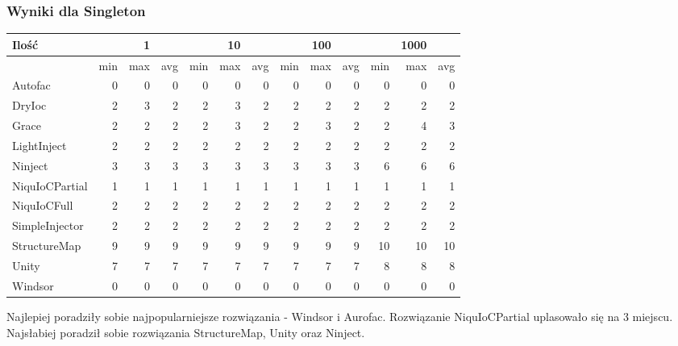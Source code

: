 \documentclass[12pt]{article}
\begin{document}
\subsubsection{Wyniki dla Singleton}
\begin{center}
\begin{small}
	\begin{tabular}{ | l | r r r | r r r | r r r | r r r | }
    		\hline
     		Ilość & & 1 & & & 10 & & & 100 & & & 1000 & \\ \hline
     		 & min & max & avg & min & max & avg & min & max & avg & min & max & avg \\ \hline
    		Autofac & 0 & 0 & 0 & 0 & 0 & 0 & 0 & 0 & 0 & 0 & 0 & 0 \\ \hline
   		DryIoc & 2 & 3 & 2 & 2 & 3 & 2 & 2 & 2 & 2 & 2 & 2 & 2 \\ \hline
		Grace & 2 & 2 & 2 & 2 & 3 & 2 & 2 & 3 & 2 & 2 & 4 & 3 \\ \hline
		LightInject & 2 & 2 & 2 & 2 & 2 & 2 & 2 & 2 & 2 & 2 & 2 & 2 \\ \hline
		Ninject & 3 & 3 & 3 & 3 & 3 & 3 & 3 & 3 & 3 & 6 & 6 & 6 \\ \hline
		NiquIoCPartial & 1 & 1 & 1 & 1 & 1 & 1 & 1 & 1 & 1 & 1 & 1 & 1 \\ \hline
		NiquIoCFull & 2 & 2 & 2 & 2 & 2 & 2 & 2 & 2 & 2 & 2 & 2 & 2 \\ \hline
		SimpleInjector & 2 & 2 & 2 & 2 & 2 & 2 & 2 & 2 & 2 & 2 & 2 & 2 \\ \hline
		StructureMap & 9 & 9 & 9 & 9 & 9 & 9 & 9 & 9 & 9 & 10 & 10 & 10 \\ \hline
		Unity & 7 & 7 & 7 & 7 & 7 & 7 & 7 & 7 & 7 & 8 & 8 & 8 \\ \hline
		Windsor & 0 & 0 & 0 & 0 & 0 & 0 & 0 & 0 & 0 & 0 & 0 & 0 \\
    		\hline
  	\end{tabular}
\end{small}
\end{center}

Najlepiej poradziły sobie najpopularniejsze rozwiązania - Windsor i Aurofac. Rozwiązanie NiquIoCPartial uplasowało się na 3 miejscu. Najsłabiej poradził sobie rozwiązania StructureMap, Unity oraz Ninject.
\end{document}
